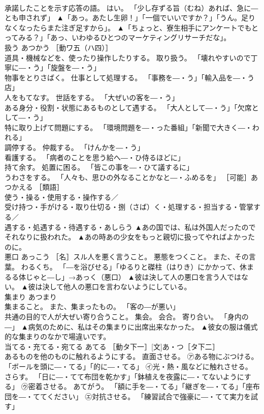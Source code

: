 \documentclass[8pt]{extreport}
\begin{document}
\begin{CJK}{UTF8}{min}
\\	承諾したことを示す応答の語。 はい。 「少し存ずる旨（むね）あれば、急に―とも申されず」	▲「あっ。あたし生卵！」「一個でいいですか？」「うん。足りなくなったらまた注ぎ足すから」。 ▲「ちょっと、寮生相手にアンケートでもとってみる？」「あっ、いわゆるひとつのマーケティングリサーチだな」。
\\	扱う	あつかう	［動ワ五（ハ四）］ 
\\	道具・機械などを、使ったり操作したりする。 取り扱う。 「壊れやすいので丁寧に―・う」「旋盤を―・う」 
\\	物事をとりさばく。 仕事として処理する。 「事務を―・う」「輸入品を―・う店」 
\\	人をもてなす。 世話をする。 「大ぜいの客を―・う」 
\\	ある身分・役割・状態にあるものとして遇する。 「大人として―・う」「欠席として―・う」 
\\	特に取り上げて問題にする。 「環境問題を―・った番組」「新聞で大きく―・われる」 
\\	調停する。 仲裁する。 「けんかを―・う」 
\\	看護する。 「病者のことを思う給へ―・ひ侍るほどに」 
\\	持て余す。 処置に困る。 「皆この事を―・ひて議するに」 
\\	うわさをする。 「人々も、思ひの外なることかなと―・ふめるを」 ［可能］あつかえる ［類語］
\\	使う・操る・使用する・操作する／
\\	受け持つ・手がける・取り仕切る・捌（さば）く・処理する・担当する・管掌する／
\\	遇する・処遇する・待遇する・あしらう	▲あの国では、私は外国人だったのでそれなりに扱われた。 ▲あの時あの少女をもっと親切に扱ってやればよかったのに。
\\	悪口	あっこう	［名］スル人を悪く言うこと。 悪態をつくこと。 また、その言葉。 わるくち。 「―を浴びせる」「ゆるりと磔柱（はりき）にかかって、休まるる体じゃと―し」→あっく（悪口）	▲彼は決して人の悪口を言う人ではない。 ▲彼は決して他人の悪口を言わないようにしている。
\\	集まり	あつまり	
\\	集まること。 また、集まったもの。 「客の―が悪い」 
\\	共通の目的で人が大ぜい寄り合うこと。 集会。 会合。 寄り合い。 「身内の―」	▲病気のために、私はその集まりに出席出来なかった。 ▲彼女の服は儀式的な集まりのなかで場違いです。
\\	当てる・充てる・宛てる	あてる	［動タ下一］[文]あ・つ［タ下二］ 
\\	あるものを他のものに触れるようにする。 直面させる。 ㋐ある物にぶつける。 「ボールを頭に―・てる」「的に―・てる」 ㋑光・熱・風などに触れさせる。 さらす。 「日に―・てて布団を乾かす」「鉢植えを夜露に―・てないようにする」 ㋒密着させる。 あてがう。 「額に手を―・てる」「継ぎを―・てる」「座布団を―・ててください」 ㋓対抗させる。 「練習試合で強豪に―・てて実力を試す」 

\end{CJK}
\end{document}
